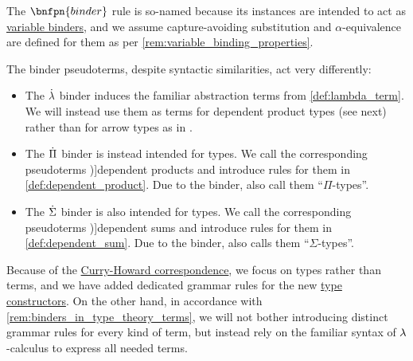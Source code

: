 \begin{definition}
  The \( \bnfpn{binder} \) rule is so-named because its instances are intended to act as \hyperref[con:variable_binding]{variable binders}, and we assume capture-avoiding substitution and \( \alpha \)-equivalence are defined for them as per \cref{rem:variable_binding_properties}.

  The binder pseudoterms, despite syntactic similarities, act very differently:
  \begin{itemize}
    \item The \( \mathord{\dot{{\mathrm \lambda}}} \) binder induces the familiar abstraction terms from \cref{def:lambda_term}. We will instead use them as terms for dependent product types (see next) rather than for arrow types as in .

    \item The \( \dot{\Pi} \) binder is instead intended for types. We call the corresponding pseudoterms \term[en=dependent product (\cite[\S 1.4]{UnivalentFoundationsProgram2024OctoberHoTT})]{dependent products} and introduce rules for them in \cref{def:dependent_product}. Due to the binder,  also call them \enquote{\( \Pi \)-types}.

    \item The \( \dot{\Sigma} \) binder is also intended for types. We call the corresponding pseudoterms \term[en=dependent sum (\cite[\S 8.3.4]{Mimram2020ProgramEqualsProof})]{dependent sums} and introduce rules for them in \cref{def:dependent_sum}. Due to the binder,  also calls them \enquote{\( \Sigma \)-types}.
  \end{itemize}
\end{definition}
\begin{comments}
  \item Because of the \hyperref[con:curry_howard_correspondence]{Curry-Howard correspondence}, we focus on types rather than terms, and we have added dedicated grammar rules for the new \hyperref[con:type_constructor]{type constructors}. On the other hand, in accordance with \cref{rem:binders_in_type_theory_terms}, we will not bother introducing distinct grammar rules for every kind of term, but instead rely on the familiar syntax of \( {\mathrm \lambda} \)-calculus to express all needed terms.
\end{comments}


